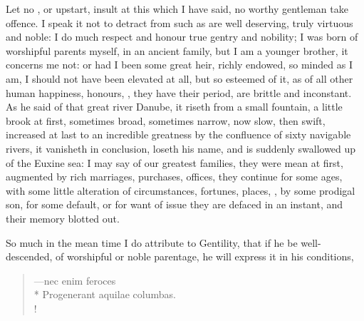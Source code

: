 {Let no , or upstart, insult at this which I have said, no worthy gentleman take offence. I speak it not to detract from such as are well deserving, truly virtuous and noble: I do much respect and honour true gentry and nobility; I was born of worshipful parents myself, in an ancient family, but I am a younger brother, it concerns me not: or had I been some great heir, richly endowed, so minded as I am, I should not have been elevated at all, but so esteemed of it, as of all other human happiness, honours, \etc{}, they have their period, are brittle and inconstant. As he said of that great river Danube, it riseth from a small fountain, a little brook at first, sometimes broad, sometimes narrow, now slow, then swift, increased at last to an incredible greatness by the confluence of sixty navigable rivers, it vanisheth in conclusion, loseth his name, and is suddenly swallowed up of the Euxine sea: I may say of our greatest families, they were mean at first, augmented by rich marriages, purchases, offices, they continue for some ages, with some little alteration of circumstances, fortunes, places, \etc{}, by some prodigal son, for some default, or for want of issue they are defaced in an instant, and their memory blotted out.

So much in the mean time I do attribute to Gentility, that if he be well-descended, of worshipful or noble parentage, he will express it in his conditions,

\begin{latin}
\begin{verse}%
---nec enim feroces\\*
Progenerant aquilae columbas.\\!
\end{verse}%
\end{latin}
%

}
